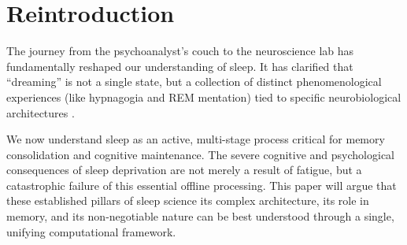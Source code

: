 \section{Reintroduction}\label{sec:reintroduction}

The journey from the psychoanalyst's couch to the neuroscience lab has fundamentally reshaped our understanding of sleep. It has clarified that ``dreaming'' is not a single state, but a collection of distinct phenomenological experiences (like hypnagogia and REM mentation) tied to specific neurobiological architectures \citep{revonsuo2013important}.

We now understand sleep as an active, multi-stage process critical for memory consolidation \citep{wilson1994reactivation} and cognitive maintenance. The severe cognitive and psychological consequences of sleep deprivation \citep{waters2018deprivation} are not merely a result of fatigue, but a catastrophic failure of this essential offline processing. This paper will argue that these established pillars of sleep science \- its complex architecture, its role in memory, and its non-negotiable nature \- can be best understood through a single, unifying computational framework.